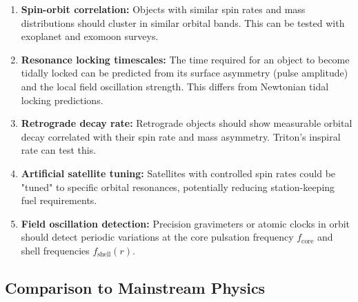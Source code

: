 \documentclass[12pt, a4paper]{article}
\begin{document}
\begin{enumerate}
    \item \textbf{Spin-orbit correlation:} Objects with similar spin rates and mass distributions should cluster in similar orbital bands. This can be tested with exoplanet and exomoon surveys.
    
    \item \textbf{Resonance locking timescales:} The time required for an object to become tidally locked can be predicted from its surface asymmetry (pulse amplitude) and the local field oscillation strength. This differs from Newtonian tidal locking predictions.
    
    \item \textbf{Retrograde decay rate:} Retrograde objects should show measurable orbital decay correlated with their spin rate and mass asymmetry. Triton's inspiral rate can test this.
    
    \item \textbf{Artificial satellite tuning:} Satellites with controlled spin rates could be "tuned" to specific orbital resonances, potentially reducing station-keeping fuel requirements.
    
    \item \textbf{Field oscillation detection:} Precision gravimeters or atomic clocks in orbit should detect periodic variations at the core pulsation frequency \( f_{\text{core}} \) and shell frequencies \( f_{\text{shell}}(r) \).
\end{enumerate}

\subsection{Comparison to Mainstream Physics}
\label{subsec:orbital_comparison}
\end{document}
